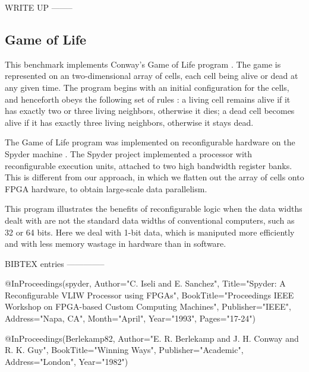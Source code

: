 WRITE UP
--------

\subsection {Game of Life}

This benchmark implements Conway's Game of Life program \cite{Berlekamp82}.
The game is represented on an two-dimensional array of cells, each cell
being alive or dead at any given time. The program begins with an 
initial configuration for the cells, and henceforth obeys the
following set of rules : a living cell remains alive if it has exactly
two or three living neighbors, otherwise it dies; a dead cell becomes alive
if it has exactly three living neighbors, otherwise it stays dead.

The Game of Life program was implemented on reconfigurable hardware
on the Spyder machine \cite{spyder}. The Spyder project implemented
a processor with reconfigurable execution units, attached to two high
bandwidth register banks. This is different from our approach, in
which we flatten out the array of cells onto FPGA hardware, to
obtain large-scale data parallelism. 

This program illustrates the benefits of reconfigurable logic when
the data widths dealt with are not the standard data widths of conventional
computers, such as 32 or 64 bits. Here we deal with 1-bit data,
which is maniputed more efficiently and with less memory wastage
in hardware than in software.

BIBTEX entries
--------------

@InProceedings(spyder,
        Author="C. Iseli and E. Sanchez",
        Title="Spyder: A Reconfigurable VLIW Processor using FPGAs",
        BookTitle="Proceedings IEEE Workshop on FPGA-based Custom 
                Computing Machines",
        Publisher="IEEE",
        Address="Napa, CA",
        Month="April",
        Year="1993",
        Pages="17-24")

@InProceedings(Berlekamp82,
        Author="E. R. Berlekamp and J. H. Conway and R. K. Guy",
        BookTitle="Winning Ways",
        Publisher="Academic",
        Address="London",
        Year="1982")



